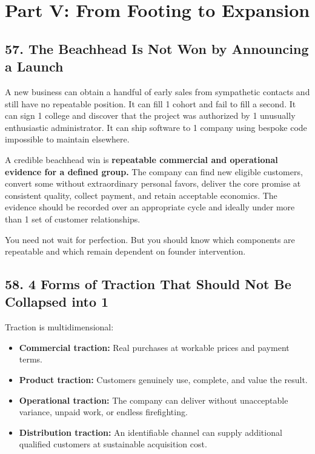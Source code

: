 \section*{Part V: From Footing to Expansion}

\subsection*{57. The Beachhead Is Not Won by Announcing a Launch}

A new business can obtain a handful of early sales from sympathetic contacts and still have no repeatable position. It can fill 1 cohort and fail to fill a second. It can sign 1 college and discover that the project was authorized by 1 unusually enthusiastic administrator. It can ship software to 1 company using bespoke code impossible to maintain elsewhere.

A credible beachhead win is \textbf{repeatable commercial and operational evidence for a defined group.} The company can find new eligible customers, convert some without extraordinary personal favors, deliver the core promise at consistent quality, collect payment, and retain acceptable economics. The evidence should be recorded over an appropriate cycle and ideally under more than 1 set of customer relationships.

You need not wait for perfection. But you should know which components are repeatable and which remain dependent on founder intervention.

\subsection*{58. 4 Forms of Traction That Should Not Be Collapsed into 1}

Traction is multidimensional:

\begin{itemize}
    \item \textbf{Commercial traction:} Real purchases at workable prices and payment terms.
    \item \textbf{Product traction:} Customers genuinely use, complete, and value the result.
    \item \textbf{Operational traction:} The company can deliver without unacceptable variance, unpaid work, or endless firefighting.
    \item \textbf{Distribution traction:} An identifiable channel can supply additional qualified customers at sustainable acquisition cost.
\end{itemize}

